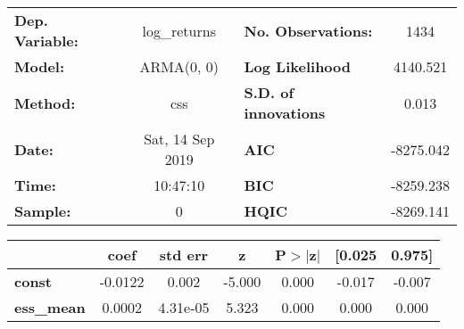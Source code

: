 \begin{center}
\begin{tabular}{lclc}
\toprule
\textbf{Dep. Variable:} &   log\_returns   & \textbf{  No. Observations:  } &    1434     \\
\textbf{Model:}         &    ARMA(0, 0)    & \textbf{  Log Likelihood     } &  4140.521   \\
\textbf{Method:}        &       css        & \textbf{  S.D. of innovations} &   0.013     \\
\textbf{Date:}          & Sat, 14 Sep 2019 & \textbf{  AIC                } & -8275.042   \\
\textbf{Time:}          &     10:47:10     & \textbf{  BIC                } & -8259.238   \\
\textbf{Sample:}        &        0         & \textbf{  HQIC               } & -8269.141   \\
\bottomrule
\end{tabular}
\begin{tabular}{lcccccc}
                   & \textbf{coef} & \textbf{std err} & \textbf{z} & \textbf{P$> |$z$|$} & \textbf{[0.025} & \textbf{0.975]}  \\
\midrule
\textbf{const}     &      -0.0122  &        0.002     &    -5.000  &         0.000        &       -0.017    &       -0.007     \\
\textbf{ess\_mean} &       0.0002  &     4.31e-05     &     5.323  &         0.000        &        0.000    &        0.000     \\
\bottomrule
\end{tabular}
\end{center}
